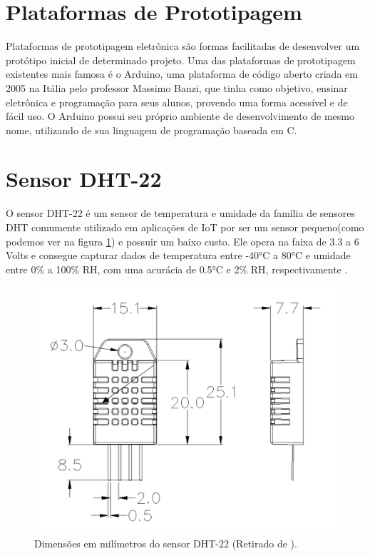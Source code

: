 \section{Plataformas de Prototipagem}
\label{fund:plataforma-proto}
Plataformas de prototipagem eletrônica são formas facilitadas de desenvolver um protótipo inicial de determinado projeto. Uma das plataformas de prototipagem existentes mais famosa é o Arduino, uma plataforma de código aberto criada em 2005 na Itália pelo professor Massimo Banzi, que tinha como objetivo, ensinar eletrônica e programação para seus alunos, provendo uma forma acessível e de fácil uso. O Arduino possui seu próprio ambiente de desenvolvimento de mesmo nome, utilizando de sua linguagem de programação baseada em C.

\section{Sensor DHT-22}
\label{fund:dht-22}
O sensor DHT-22 é um sensor de temperatura e umidade da família de sensores DHT comumente utilizado em aplicações de IoT por ser um sensor pequeno(como podemos ver na figura \ref{fig:dht-22}) e possuir um baixo custo. Ele opera na faixa de 3.3 a 6 Volts e consegue capturar dados de temperatura entre -40°C a 80°C e umidade entre 0\% a 100\% RH, com uma acurácia de 0.5°C e 2\% RH, respectivamente \cite{datasheetDHT22}.

\begin{figure}[H]
  \centering
  \includegraphics[width=.80\textwidth]{assets/dht-22.png} 
  \caption{Dimensões em milímetros do sensor DHT-22 (Retirado de \cite{datasheetDHT22}).}
  \label{fig:dht-22} 
\end{figure}

